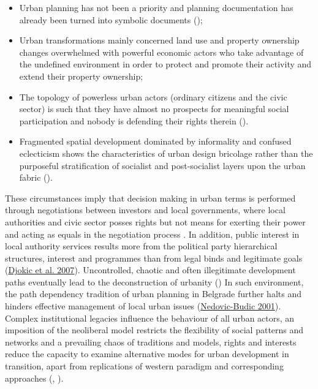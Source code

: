 \documentclass[11pt]{report}
\begin{document}
\begin{itemize}
\item Urban planning has not been a priority \href{ref}{\citealt{sykora_transitional_1999}} and planning documentation has already been turned into symbolic documents (\cite{Nedovic-Budic 2001});

\item Urban transformations mainly concerned land use and property ownership changes overwhelmed with powerful economic actors who take advantage of the undefined environment in order to protect and promote their activity and extend their property ownership;
 
\item The topology of powerless urban actors (ordinary citizens and the civic sector) is such that they have almost no prospects for meaningful social participation and nobody is defending their rights therein (\href{ref}{\citealt{vujovic_belgrades_2007}}).

\item Fragmented spatial development dominated by informality and confused eclecticism shows the characteristics of urban design bricolage rather than the purposeful stratification of socialist and post-socialist layers upon the urban fabric (\href{ref}{\citealt{hirt_belgrade_2009}}). 
\end{itemize}

These circumstances imply that decision making in urban terms is performed through negotiations between investors and local governments, where local authorities and civic sector posses rights but not means for exerting their power and acting as equals in the negotiation process \href{ref}{\citealt{bajec_rational_2009}}.
In addition, public interest in local authority services results more from the political party hierarchical structures, interest and programmes than from legal binds and legitimate goals (\href{ref}{Djokic et al. 2007}).
Uncontrolled, chaotic and often illegitimate development paths eventually lead to the deconstruction of urbanity (\href{ref}{\citealt{vujovic_belgrades_2007}})
In such environment, the path dependency tradition of urban planning in Belgrade further halts and hinders effective management of local urban issues (\href{ref}{Nedovic-Budic 2001}).
Complex institutional legacies influence the behaviour of all urban actors, an imposition of the neoliberal model restricts the flexibility of social patterns and networks and a prevailing chaos of traditions and models, rights and interests reduce the capacity to examine alternative modes for urban development in transition, apart from replications of western paradigm and corresponding approaches 
(\href{ref}{\citealt{tsenkova_urban_2007}}, \href{ref}{\citealt{petrovic_cities_2009}}).
   
\end{document}
